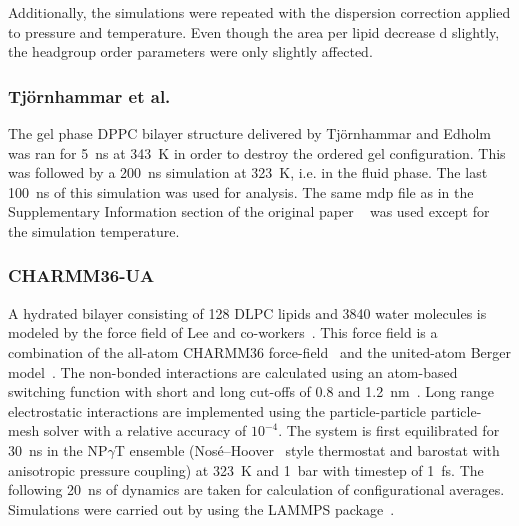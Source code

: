 \documentclass[journal=jacsat,manuscript=article]{achemso}
\begin{document}
Additionally, the simulations were repeated with the dispersion correction applied to pressure and temperature. Even though the area per lipid decrease
d slightly, the headgroup order parameters were only slightly affected.

\subsubsection{Tj\"ornhammar et al.}
The gel phase DPPC bilayer structure delivered by Tj\"ornhammar  and Edholm~\cite{tjornhammar14} was ran for 5~ns at 343~K in order to destroy the 
ordered gel configuration. This was followed by a 200~ns simulation at 323~K, i.e. in the fluid phase. The last 100~ns of this simulation was used for analysis. 
The same mdp file as in the Supplementary Information section of the original paper ~\cite{tjornhammar14} was used except for the simulation temperature.

\subsubsection{CHARMM36-UA}
A hydrated bilayer consisting of 128 DLPC lipids and 3840 water molecules is modeled by the force field of Lee and co-workers~\cite{lee14}.
This force field is a combination of the all-atom CHARMM36 force-field~\cite{klauda10} and the united-atom Berger model~\cite{berger97}. 
The non-bonded interactions are calculated using an atom-based switching function with short and long cut-offs of 0.8 and 1.2~nm~\cite{lee14}. 
Long range electrostatic interactions are implemented using the particle-particle particle-mesh solver with a relative accuracy of $10^{-4}$. The system 
is first equilibrated for 30~ns in the NP$\gamma$T ensemble (Nos\'{e}--Hoover~\cite{nose84,hoover85} style thermostat and barostat with anisotropic pressure coupling) 
at 323~K and 1~bar with timestep of 1~fs. The following 20~ns of dynamics are taken for calculation of configurational averages. 
Simulations were carried out by using the LAMMPS package~\cite{plimpton95}. %
\end{document}
